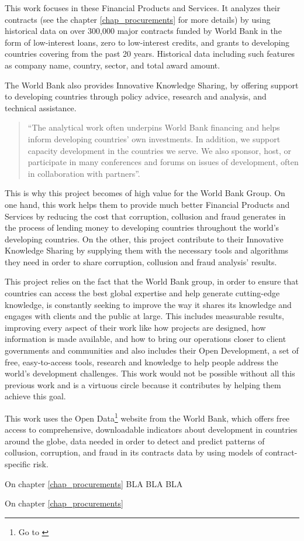 This work focuses in these Financial Products and Services. It analyzes their contracts (see the chapter \ref{chap_procurements} for more details) by using historical data on over 300,000 major contracts funded by World Bank in the form of low-interest loans, zero to low-interest credits, and grants to developing countries covering  from the past 20 years. Historical data including such features as company name, country, sector, and total award amount.

The World Bank also provides Innovative Knowledge Sharing, by offering support to developing countries through policy advice, research and analysis, and technical assistance. \begin{quote}
``The analytical work often underpins World Bank financing and helps inform developing countries' own investments. In addition, we support capacity development in the countries we serve. We also sponsor, host, or participate in many conferences and forums on issues of development, often in collaboration with partners''\parencite{wb_about}.
\end{quote}

This is why this project becomes of high value for the World Bank Group. On one hand, this work helps them to provide much better Financial Products and Services by reducing the cost that corruption, collusion and fraud generates in the process of lending money to developing countries throughout the world's developing countries. On the other, this project contribute to their Innovative Knowledge Sharing by supplying them with the necessary tools and algorithms they need in order to share corruption, collusion and fraud analysis' results.

This project relies on the fact that the World Bank group, in order to ensure that countries can access the best global expertise and help generate cutting-edge knowledge, is constantly seeking to improve the way it shares its knowledge and engages with clients and the public at large. This includes  measurable results, improving every aspect of their work like how projects are designed, how information is made available, and how to bring our operations closer to client governments and communities and also includes  their Open Development, a set of free, easy-to-access tools, research and knowledge to help people address the world's development challenges. This work would not be possible without all this previous work and is a virtuous circle because it contributes by helping them achieve this goal.

This work uses the Open Data\footnote{Go to \cite{wb_data}} website from the World Bank, which offers free access to comprehensive, downloadable indicators about development in countries around the globe, data needed in order to detect and predict patterns of collusion, corruption, and fraud in its contracts data by using models of contract-specific risk. 

On chapter \ref{chap_procurements} BLA BLA BLA


On chapter \ref{chap_procurements}




